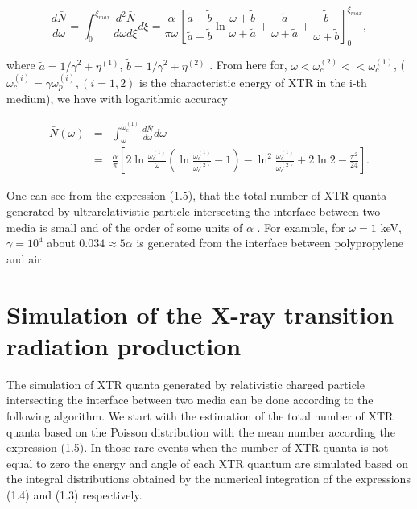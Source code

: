 \begin{equation}
\frac{d\bar{N}}{d\omega} = 
\int_{0}^{\xi_{max}}\frac{d^2\bar{N}}{d\omega d\xi}d\xi = 
\frac{\alpha}{\pi\omega}
\left[
\frac{\tilde{a} + \tilde{b}}{\tilde{a} - \tilde{b}}
\ln\frac{\omega + \tilde{b}}{\omega + \tilde{a}} + 
\frac{\tilde{a}}{\omega + \tilde{a}} + 
\frac{\tilde{b}}{\omega + \tilde{b}}
\right]_{0}^{\xi_{max}} ,
\end{equation}

where $\tilde{a} = 1/\gamma^2 + \eta^{(1)}$, 
$\tilde{b} = 1/\gamma^2 + \eta^{(2)}$ . From here for, 
$\omega < \omega_{c}^{(2)} << \omega_{c}^{(1)}$,
($\omega_{c}^{(i)} = \gamma\omega_{p}^{(i)}, (i = 1,2)$ is the characteristic 
energy of XTR in the i-th medium), we have with logarithmic accuracy

\begin{eqnarray}
\bar{N}(\omega)& = &
\int_{\omega}^{\omega_{c}^{(1)}}\frac{d\bar{N}}{d\omega}d\omega \nonumber\\
               & = &
\frac{\alpha}{\pi}
\left[
2\ln\frac{\omega_{c}^{(1)}}{\omega}
\left(\ln\frac{\omega_{c}^{(1)}}{\omega_{c}^{(2)}} - 1\right) - 
\ln^2\frac{\omega_{c}^{(1)}}{\omega_{c}^{(2)}} + 2\ln2 -\frac{\pi^2}{24}
\right].
\end{eqnarray}

One can see from the expression (1.5), that the total number of XTR quanta 
generated by ultrarelativistic particle intersecting the interface between 
two media is small and of the order of some units of $\alpha$ . For example, 
for $\omega = 1$ keV, $\gamma = 10^4$ about $0.034 \approx 5\alpha$    
is generated from the interface between polypropylene and air.

\section{Simulation of the X-ray transition radiation production}

The simulation of XTR quanta generated by relativistic charged particle 
intersecting the interface between two media can be done according to the 
following algorithm. We start with the estimation of the total number of XTR 
quanta based on the Poisson distribution with the mean number according the 
expression (1.5). In those rare events when the number of XTR quanta is not 
equal to zero the energy and angle of each XTR quantum are simulated based 
on the integral distributions obtained by the numerical integration of the 
expressions (1.4) and (1.3) respectively. 

